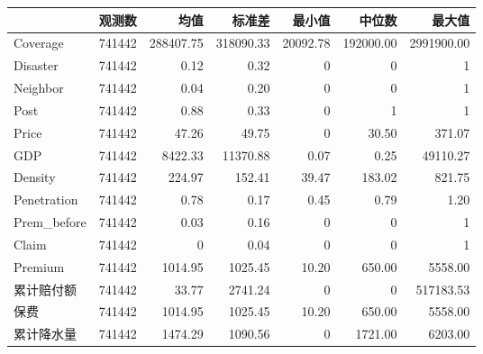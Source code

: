 \begin{tabular}{lrrrrrr}
\toprule
 & 观测数 & 均值 & 标准差 & 最小值 & 中位数 & 最大值 \\
\midrule
Coverage & 741442 & 288407.75 & 318090.33 & 20092.78 & 192000.00 & 2991900.00 \\
Disaster & 741442 & 0.12 & 0.32 & 0 & 0 & 1 \\
Neighbor & 741442 & 0.04 & 0.20 & 0 & 0 & 1 \\
Post & 741442 & 0.88 & 0.33 & 0 & 1 & 1 \\
Price & 741442 & 47.26 & 49.75 & 0 & 30.50 & 371.07 \\
GDP & 741442 & 8422.33 & 11370.88 & 0.07 & 0.25 & 49110.27 \\
Density & 741442 & 224.97 & 152.41 & 39.47 & 183.02 & 821.75 \\
Penetration & 741442 & 0.78 & 0.17 & 0.45 & 0.79 & 1.20 \\
Prem\_before & 741442 & 0.03 & 0.16 & 0 & 0 & 1 \\
Claim & 741442 & 0 & 0.04 & 0 & 0 & 1 \\
Premium & 741442 & 1014.95 & 1025.45 & 10.20 & 650.00 & 5558.00 \\
累计赔付额 & 741442 & 33.77 & 2741.24 & 0 & 0 & 517183.53 \\
保费 & 741442 & 1014.95 & 1025.45 & 10.20 & 650.00 & 5558.00 \\
累计降水量 & 741442 & 1474.29 & 1090.56 & 0 & 1721.00 & 6203.00 \\
\bottomrule
\end{tabular}
